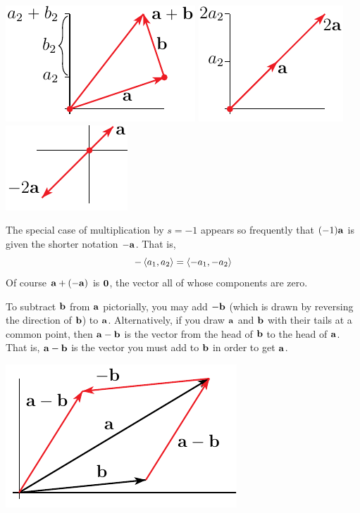 \begin{wfig}
  \begin{center}
  \includegraphics{addvec.pdf}\qquad\qquad
  \includegraphics{scalmul.pdf}\qquad\qquad
  \includegraphics{negmul.pdf}
  \end{center}
\end{wfig}
The special case of multiplication by $s=-1$ appears so frequently that
$(-1)\mathbf{a}$ is given the shorter notation $-\mathbf{a}$. That is, 
\begin{equation*}
-\left< a_1,a_2\right>=\left< -a_1,-a_2\right>
\end{equation*}
Of course $\mathbf{a}+(-\mathbf{a})$ is $\mathbf{0}$, the vector all of whose components
are zero. 

To subtract $\mathbf{b}$ from $\mathbf{a}$ pictorially, 
you may add $-\mathbf{b}$ (which is drawn by reversing the direction of $\mathbf{b}$)
 to $\mathbf{a}$. Alternatively,
if you draw $\mathbf{a}$ and $\mathbf{b}$ with their tails at a common point,
then $\mathbf{a}-\mathbf{b}$ is the vector from the head of $\mathbf{b}$ to
the head of $\mathbf{a}$. That is, $\mathbf{a}-\mathbf{b}$ is the vector you
must add to $\mathbf{b}$ in order to get $\mathbf{a}$.
\begin{efig}
  \begin{center}
  \includegraphics{subtract.pdf}
  \end{center}
\end{efig}



